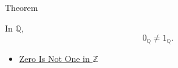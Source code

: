 \begin{theorembox}{Theorem}
\begin{theorem}
\label{thm:zero-not-one-in-q}
In $\mathbb{Q}$,
\[
0_{\mathbb{Q}}\ne 1_{\mathbb{Q}}.
\]
\end{theorem}
\end{theorembox}

\begin{dependencies}
\begin{itemize}
  \item \hyperref[thm:zero-not-one-in-z]{Zero Is Not One in $\mathbb{Z}$}
\end{itemize}
\end{dependencies}

